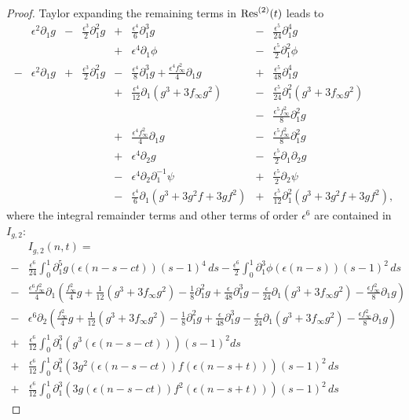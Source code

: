 \begin{proof}
	Taylor expanding the remaining terms in \(\mathrm{Res}^{(2)}(t)\) leads to 
	\begin{equation}\label{G-res2}
	\begin{aligned}
			&\epsilon^2 \partial_1 g & - & \frac{\epsilon^3} 2 \partial_1^2g & + & \frac{\epsilon^4} 6 \partial_1^3 g & - & \frac{\epsilon^5}{24} \partial_1^4 g  \\
			&&&&+&\epsilon^4 \partial_1 \phi & - & \frac{\epsilon^5} 2 \partial_1^2  \phi \\
			-&\epsilon^2\partial_1 g & + & \frac{\epsilon^3} 2 \partial_1^2 g & - & \frac{\epsilon^4} 8 \partial_1^3 g  + \frac{\epsilon^4 f_\infty^2} 4 \partial_1 g & + & \frac{\epsilon^5}{48} \partial_1^4 g \\
			&&&&+ & \frac{\epsilon^4}{12} \partial_1(g^3 + 3f_\infty g^2) & - & \frac{\epsilon^5}{24} \partial_1^2(g^3 + 3f_\infty g^2)\\
			&&&&&& - & \frac{\epsilon^5f_\infty ^2} 8 \partial_1^2 g \\
			&&&&+&\frac{\epsilon^4f_\infty ^2} 4 \partial_1g  & - & \frac{\epsilon^5f_\infty ^2} 8 \partial_1^2 g \\
			&&&& +&\epsilon^4 \partial_2 g & - & \frac{\epsilon^5} 2 \partial_1 \partial_2 g \\ 
			&&&&-&\epsilon^4 \partial_2 \partial_1^{-1} \psi & + & \frac{\epsilon^5} 2 \partial_2 \psi\\
			&&&&-&\frac{\epsilon^4} 6 \partial_1(g^3 + 3g^2 f + 3gf^2) & + & \frac{\epsilon^5}{12}\partial_1^2(g^3 + 3g^2 f + 3gf^2),
	\end{aligned}
	\end{equation} 
	where the integral remainder terms and other terms of order \(\epsilon^6\) are contained in \(I_{g,2}\):
	\begin{equation}\label{Ig2}
	\begin{aligned}
		&I_{g,2}(n,t) = \\
		- & \frac{\epsilon^6} {24} \int_{0}^1 \partial_1^5 g(\epsilon(n-s-ct))  (s-1)^4 \, ds -  \frac{\epsilon^6}2 \int_0^1 \partial_1^3 \phi(\epsilon (n-s)) (s-1)^2\, ds \\
		- & \frac{\epsilon^6 f_\infty^2}{4}\partial_1\left( \frac{f_\infty^2} 4  g + \frac{1}{12}(g^3 + 3f_\infty g^2) -\frac{ 1} 8 \partial_1^2 g  + \frac{\epsilon}{48} \partial_1^3 g - \frac{\epsilon}{24} \partial_1(g^3 + 3f_\infty g^2) - \frac{\epsilon f_\infty^2} 8 \partial_1 g\right) \\
		-&  \epsilon^6\partial_2\left( \frac{f_\infty^2} 4  g + \frac{1}{12}(g^3 + 3f_\infty g^2) -\frac{ 1} 8 \partial_1^2 g  + \frac{\epsilon}{48} \partial_1^3 g - \frac{\epsilon}{24} \partial_1(g^3 + 3f_\infty g^2) - \frac{\epsilon f_\infty^2} 8 \partial_1 g\right) \\
		+ & \frac{\epsilon^6} {12} \int_0^1 \partial_1^3(g^3(\epsilon(n-s-ct))) (s-1)^2 ds  \\
		+ & \frac{\epsilon^6} {12} \int_0^1 \partial_1^3( 3g^2(\epsilon(n-s-ct))f(\epsilon(n-s+t))) (s-1)^2\, ds \\
		+ & \frac{\epsilon^6} {12} \int_0^1 \partial_1^3 (3g(\epsilon(n-s-ct))f^2(\epsilon(n-s+t))) (s-1)^2 \, ds
	\end{aligned}
	\end{equation}
	

\end{proof}
